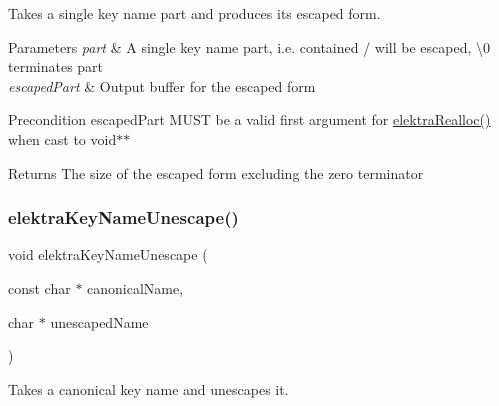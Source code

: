 Takes a single key name part and produces its escaped form. 


\begin{DoxyParams}{Parameters}
{\em part} & A single key name part, i.\+e. contained \textquotesingle{}/\textquotesingle{} will be escaped, \textquotesingle{}\textbackslash{}0\textquotesingle{} terminates part \\
\hline
{\em escaped\+Part} & Output buffer for the escaped form\\
\hline
\end{DoxyParams}
\begin{DoxyPrecond}{Precondition}
{\ttfamily escaped\+Part} M\+U\+ST be a valid first argument for \hyperlink{internal_8c_ab0432d6765c40a5408a204c43747f4d4}{elektra\+Realloc()} when cast to {\ttfamily void$\ast$$\ast$}
\end{DoxyPrecond}
\begin{DoxyReturn}{Returns}
The size of the escaped form excluding the zero terminator 
\end{DoxyReturn}
\mbox{\label{group__keyname_ga85dd2a5169e900c6c8371c54c7944edb}} 
\subsubsection{\texorpdfstring{elektra\+Key\+Name\+Unescape()}{elektraKeyNameUnescape()}}
{\footnotesize\ttfamily void elektra\+Key\+Name\+Unescape (\begin{DoxyParamCaption}\item[{const char $\ast$}]{canonical\+Name,  }\item[{char $\ast$}]{unescaped\+Name }\end{DoxyParamCaption})}



Takes a canonical key name and unescapes it. 


